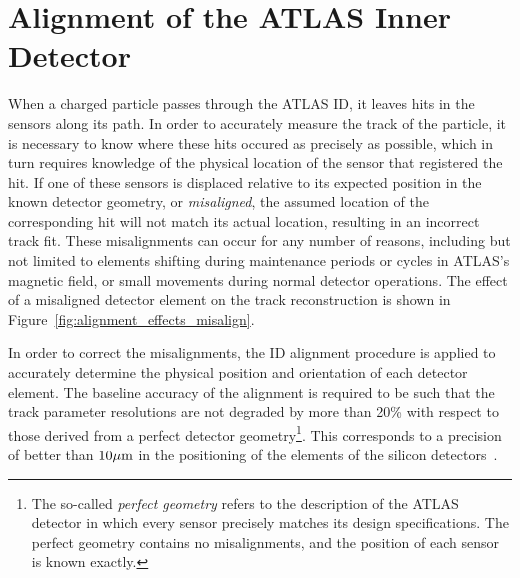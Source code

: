 \chapter[Alignment of the ATLAS Inner Detector][Alignment of the ATLAS Inner Detector]{Alignment of the ATLAS Inner Detector}
\label{ch:alignment}

When a charged particle passes through the ATLAS ID, it leaves hits in the sensors along its path.
In order to accurately measure the track of the particle, it is necessary to know where these hits occured as precisely as possible, which in turn requires knowledge of the physical location of the sensor that registered the hit.
If one of these sensors is displaced relative to its expected position in the known detector geometry, or \emph{misaligned}, the assumed location of the corresponding hit will not match its actual location, resulting in an incorrect track fit.
These misalignments can occur for any number of reasons, including but not limited to elements shifting during maintenance periods or cycles in ATLAS's magnetic field, or small movements during normal detector operations.
The effect of a misaligned detector element on the track reconstruction is shown in Figure~\ref{fig:alignment_effects_misalign}. %

In order to correct the misalignments, the ID alignment procedure is applied to accurately determine the physical position and orientation of each detector element.
The baseline accuracy of the alignment is required to be such that the track parameter resolutions are not degraded by more than 20\% with respect to those derived from a perfect detector geometry\footnote{The so-called \emph{perfect geometry} refers to the description of the ATLAS detector in which every sensor precisely matches its design specifications.  The perfect geometry contains no misalignments, and the position of each sensor is known exactly.}.
This corresponds to a precision of better than $10\mu\textrm{m}$ in the positioning of the elements of the silicon detectors~\cite{TDR-ID1}.

